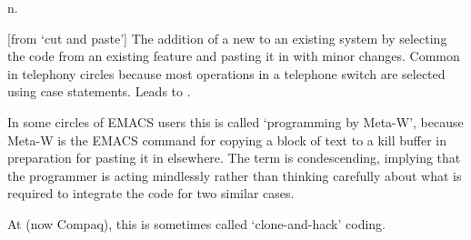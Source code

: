  n.

[from `cut and paste'] The addition of a new  to an existing
system by selecting the code from an existing feature and pasting it in with
minor changes. Common in telephony circles because most operations in a
telephone switch are selected using case statements. Leads to
.

In some circles of EMACS users this is called `programming by Meta-W', because
Meta-W is the EMACS command for copying a block of text to a kill buffer in
preparation for pasting it in
elsewhere. The term is condescending, implying that the programmer is acting
mindlessly rather than thinking carefully about what is required to integrate
the code for two similar cases.

At  (now Compaq), this is sometimes called `clone-and-hack'
coding.

